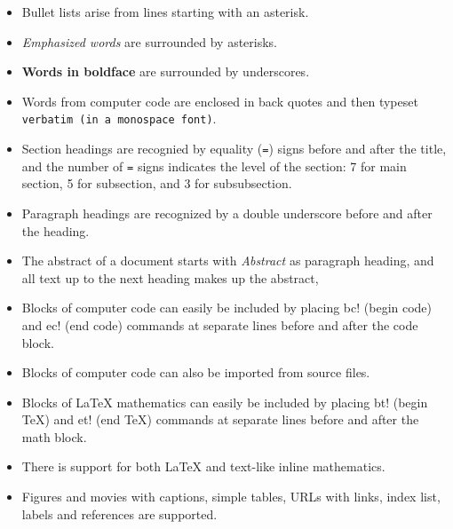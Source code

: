 \documentclass[%
oneside,                 %
final,                   %
10pt]{article}
\begin{document}
\begin{itemize}
  \item Bullet lists arise from lines starting with an asterisk.

  \item \emph{Emphasized words} are surrounded by asterisks.

  \item \textbf{Words in boldface} are surrounded by underscores.

  \item Words from computer code are enclosed in back quotes and
    then typeset {\fontsize{10pt}{10pt}\Verb!verbatim (in a monospace font)!}.

  \item Section headings are recognied by equality ({\fontsize{10pt}{10pt}\Verb!=!}) signs before
    and after the title, and the number of {\fontsize{10pt}{10pt}\Verb!=!} signs indicates the
    level of the section: 7 for main section, 5 for subsection, and
    3 for subsubsection.

  \item Paragraph headings are recognized by a double underscore
    before and after the heading.

  \item The abstract of a document starts with \emph{Abstract} as paragraph
    heading, and all text up to the next heading makes up the abstract,

  \item Blocks of computer code can easily be included by placing
    {\fontsize{10pt}{10pt}\Verb!!bc!} (begin code) and {\fontsize{10pt}{10pt}\Verb!!ec!} (end code) commands at separate lines
    before and after the code block.

  \item Blocks of computer code can also be imported from source files.

  \item Blocks of {\LaTeX} mathematics can easily be included by placing
    {\fontsize{10pt}{10pt}\Verb!!bt!} (begin TeX) and {\fontsize{10pt}{10pt}\Verb!!et!} (end TeX) commands at separate lines
    before and after the math block.

  \item There is support for both {\LaTeX} and text-like inline mathematics.

  \item Figures and movies with captions, simple tables,
    URLs with links, index list, labels and references are supported.


\end{itemize}
\end{document}
